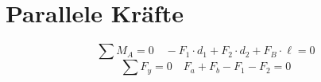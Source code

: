 



\section{Parallele Kräfte}
\[ \sum M_A = 0 \quad -F_1 \cdot d_1 + F_2 \cdot d_2 + F_B \cdot \ell = 0 \]
\[ \sum F_y = 0 \quad F_a + F_b - F_1 - F_2 = 0 \]
